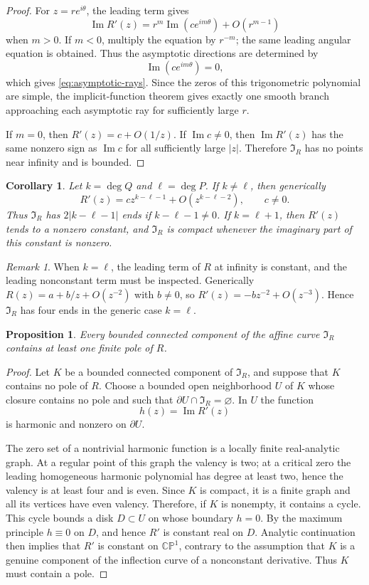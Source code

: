 \documentclass[11pt,reqno]{amsart}
\newtheorem{proposition}[theorem]{Proposition}
\newtheorem{corollary}[theorem]{Corollary}
\theoremstyle{definition}
\theoremstyle{remark}
\newtheorem{remark}[theorem]{Remark}
\newcommand{\CP}{\mathbb {CP}}
\newcommand{\I}{\mathfrak I}
\renewcommand{\Im}{\operatorname{Im}}
\begin{document}
\begin{proof}
For $z=re^{i\theta}$, the leading term gives
\[
        \Im R'(z)=r^m\Im(c e^{im\theta})+O(r^{m-1})
\]
when $m>0$.  If $m<0$, multiply the equation by $r^{-m}$; the same leading angular equation is obtained.  Thus the asymptotic directions are determined by
\[
        \Im(c e^{im\theta})=0,
\]
which gives \eqref{eq:asymptotic-rays}.  Since the zeros of this trigonometric polynomial are simple, the implicit-function theorem gives exactly one smooth branch approaching each asymptotic ray for sufficiently large $r$.

If $m=0$, then $R'(z)=c+O(1/z)$.  If $\Im c\ne0$, then $\Im R'(z)$ has the same nonzero sign as $\Im c$ for all sufficiently large $|z|$.  Therefore $\I_R$ has no points near infinity and is bounded.
\end{proof}

\begin{corollary}\label{cor:degree-cases}
Let $k=\deg Q$ and $\ell=\deg P$.  If $k\ne\ell$, then generically
\[
        R'(z)=c z^{k-\ell-1}+O(z^{k-\ell-2}),
        \qquad c\ne0.
\]
Thus $\I_R$ has $2|k-\ell-1|$ ends if $k-\ell-1\ne0$.  If $k=\ell+1$, then $R'(z)$ tends to a nonzero constant, and $\I_R$ is compact whenever the imaginary part of this constant is nonzero.
\end{corollary}

\begin{remark}
When $k=\ell$, the leading term of $R$ at infinity is constant, and the leading nonconstant term must be inspected.  Generically $R(z)=a+b/z+O(z^{-2})$ with $b\ne0$, so $R'(z)=-bz^{-2}+O(z^{-3})$.  Hence $\I_R$ has four ends in the generic case $k=\ell$.
\end{remark}

\begin{proposition}\label{prop:no-compact-without-pole}
Every bounded connected component of the affine curve $\I_R$ contains at least one finite pole of $R$.
\end{proposition}

\begin{proof}
Let $K$ be a bounded connected component of $\I_R$, and suppose that $K$ contains no pole of $R$.  Choose a bounded open neighborhood $U$ of $K$ whose closure contains no pole and such that $\partial U\cap\I_R=\varnothing$.  In $U$ the function
\[
        h(z)=\Im R'(z)
\]
is harmonic and nonzero on $\partial U$.

The zero set of a nontrivial harmonic function is a locally finite real-analytic graph.  At a regular point of this graph the valency is two; at a critical zero the leading homogeneous harmonic polynomial has degree at least two, hence the valency is at least four and is even.  Since $K$ is compact, it is a finite graph and all its vertices have even valency.  Therefore, if $K$ is nonempty, it contains a cycle.  This cycle bounds a disk $D\subset U$ on whose boundary $h=0$.  By the maximum principle $h\equiv0$ on $D$, and hence $R'$ is constant real on $D$.  Analytic continuation then implies that $R'$ is constant on $\CP^1$, contrary to the assumption that $K$ is a genuine component of the inflection curve of a nonconstant derivative.  Thus $K$ must contain a pole.
\end{proof}
\end{document}
